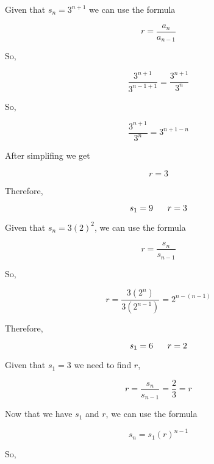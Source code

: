 \documentclass{report}
\begin{document}
Given that $s_n = 3^{n+1}$ we can use the formula 
\vspace{2mm}

$$r = \frac{a_n}{a_{n-1}}$$
\vspace{2mm}

So, 

$$ \frac{3^{n+1}}{3^{n-1+1}} = \frac{3^{n+1}}{3^n}$$

\bigbreak 
So,

$$\frac{3^{n+1}}{3^n} = 3^{n+1 -n}$$
\vspace{3mm}

After simplifing we get

$$r = 3$$
\vspace{3mm}

Therefore,

$$s_1 = 9 \hspace{6mm} r = 3$$
\bigbreak \noindent \bigbreak \noindent

\bigbreak \noindent

Given that $s_n = 3(2)^2$, we can use the formula

$$r= \frac{s_n}{s_{n-1}}$$
\vspace{3mm}

So,

$$ r = \frac{3\left(2^n\right)}{3\left(2^{n-1}\right)} = 2^{n - (n-1)}$$

Therefore,

$$ s_1 = 6 \hspace{6mm} r = 2$$
\pagebreak
{}
\bigbreak \noindent

Given that $s_1 = 3$ we need to find $r$,

$$ r = \frac{s_n}{s_{n-1}} = \frac{2}{3} = r$$ 

Now that we have $s_1$ and $r$, we can use the formula 

$$s_n = s_1(r)^{n-1}$$

So, 
\end{document}
